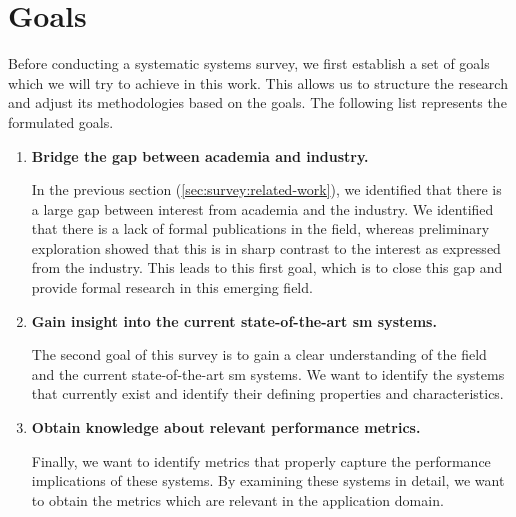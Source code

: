 \section{Goals}
\label{sec:survey:goals}


Before conducting a systematic systems survey, we first establish a set of goals which we will try to achieve in this work. This allows us to structure the research and adjust its methodologies based on the goals. The following list represents the formulated goals.

\begin{enumerate}[label=\textbf{G\arabic*}, leftmargin=3\parindent]
    \item \textbf{Bridge the gap between academia and industry.}
    \label{g-1}
    
    In the previous section (\cref{sec:survey:related-work}), we identified that there is a large gap between interest from academia and the industry. We identified that there is a lack of formal publications in the field, whereas preliminary exploration showed that this is in sharp contrast to the interest as expressed from the industry. This leads to this first goal, which is to close this gap and provide formal research in this emerging field.
    
    \item \textbf{Gain insight into the current state-of-the-art \gls{sm} systems.}
    \label{g-2}
    
    The second goal of this survey is to gain a clear understanding of the field and the current state-of-the-art \gls{sm} systems. We want to identify the systems that currently exist and identify their defining properties and characteristics.

    \item \textbf{Obtain knowledge about relevant performance metrics.}
    \label{g-3}
    
    Finally, we want to identify metrics that properly capture the performance implications of these systems. By examining these systems in detail, we want to obtain the metrics which are relevant in the application domain. 

\end{enumerate}

